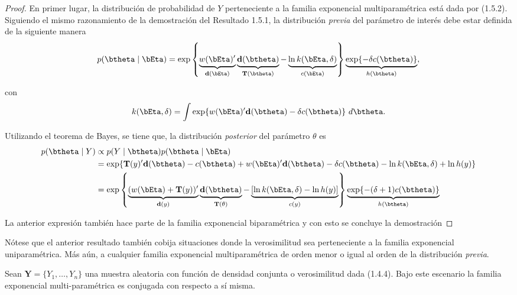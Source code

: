 \begin{proof}
En primer lugar, la distribución de probabilidad de $Y$ perteneciente a la familia exponencial  multiparamétrica está dada por (1.5.2). Siguiendo el mismo razonamiento de la demostración del Resultado 1.5.1, la distribución \emph{previa} del parámetro de interés debe estar definida de la siguiente manera
\begin{equation}
p(\btheta \mid \bEta)=\exp\left\{\underbrace{w(\bEta)'}_{\mathbf{d}(\bEta)}
\underbrace{\mathbf{d}(\btheta)}_{\mathbf{T}(\btheta)} - \underbrace{\ln k(\bEta,\delta)}_{c(\bEta)}\right\}\underbrace{\exp\{-\delta c(\btheta)\}}_{h(\btheta)},
\end{equation}

con
\begin{equation*}
k(\bEta,\delta)=\int\exp\{w(\bEta)'\mathbf{d}(\btheta)-\delta c(\btheta)\} \ d\btheta.
\end{equation*}

Utilizando el teorema de Bayes, se tiene que, la distribución \emph{posterior} del parámetro $\theta$ es
\begin{align*}
p(\btheta \mid Y) &\propto p(Y \mid \btheta)p(\btheta \mid \bEta)\\
&= \exp\{\mathbf{T}(y)'\mathbf{d}(\btheta) - c(\btheta) + w(\bEta)' \mathbf{d}(\btheta) - \delta c(\btheta) - \ln k(\bEta,\delta) +\ln h(y)\}\\
& =
\exp\left\{\underbrace{(w(\bEta)+\mathbf{T}(y))'}_{\mathbf{d}(y)}
\underbrace{\mathbf{d}(\btheta)}_{\mathbf{T}(\theta)} - \underbrace{\left[\ln k(\bEta,\delta)-\ln h(y)\right]}_{c(y)}\right\}\underbrace{\exp\{-(\delta+1)c(\btheta)\}}_{h(\btheta)}
\end{align*}

La anterior expresión también hace parte de la familia exponencial biparamétrica y con esto se concluye la demostración
\end{proof}

Nótese que el anterior resultado también cobija situaciones donde la verosimilitud sea perteneciente a la familia exponencial uniparamétrica. Más aún, a cualquier familia exponencial multiparamétrica de orden menor o igual al orden de la distribución \emph{previa}.

\begin{Res}
Sean $\mathbf{Y}=\{Y_1, \ldots, Y_n\}$ una muestra aleatoria con función de densidad conjunta o verosimilitud dada (1.4.4). Bajo este escenario la familia exponencial multi-paramétrica es conjugada con respecto a sí misma.
\end{Res}

